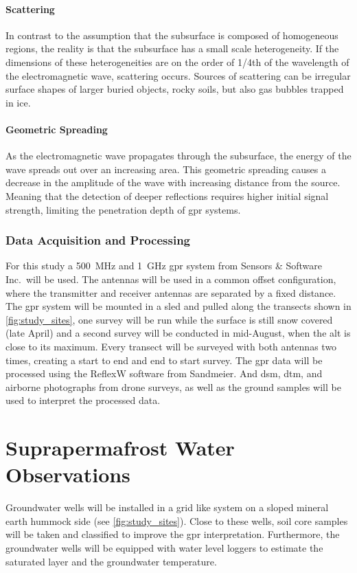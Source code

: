 \paragraph{Scattering}
In contrast to the assumption that the subsurface is composed of homogeneous regions, the reality is that the subsurface has a small scale heterogeneity. 
If the dimensions of these heterogeneities are on the order of 1/4th of the wavelength of the electromagnetic wave, scattering occurs. 
Sources of scattering can be irregular surface shapes of larger buried objects, rocky soils, but also gas bubbles trapped in ice. 

\paragraph{Geometric Spreading}
As the electromagnetic wave propagates through the subsurface, the energy of the wave spreads out over an increasing area. 
This geometric spreading causes a decrease in the amplitude of the wave with increasing distance from the source. 
Meaning that the detection of deeper reflections requires higher initial signal strength, limiting the penetration depth of \gls{gpr} systems.

\subsubsection{Data Acquisition and Processing}
For this study a \SI{500}{\mega\hertz} and \SI{1}{\giga\hertz} \gls{gpr} system from Sensors \& Software Inc.\ will be used. 
The antennas will be used in a common offset configuration, where the transmitter and receiver antennas are separated by a fixed distance. 
The \gls{gpr} system will be mounted in a sled and pulled along the transects shown in \cref{fig:study_sites}, one survey will be run while the surface is still snow covered (late April) and a second survey will be conducted in mid-August, when the \gls{alt} is close to its maximum. 
Every transect will be surveyed with both antennas two times, creating a start to end and end to start survey.
The \gls{gpr} data will be processed using the ReflexW software from Sandmeier. 
And \gls{dsm}, \gls{dtm}, and airborne photographs from drone surveys, as well as the ground samples will be used to interpret the processed data. 

\section{Suprapermafrost Water Observations}
Groundwater wells will be installed in a grid like system on a sloped mineral earth hummock side (see \cref{fig:study_sites}). 
Close to these wells, soil core samples will be taken and classified to improve the \gls{gpr} interpretation. 
Furthermore, the groundwater wells will be equipped with water level loggers to estimate the saturated layer and the groundwater temperature. 


